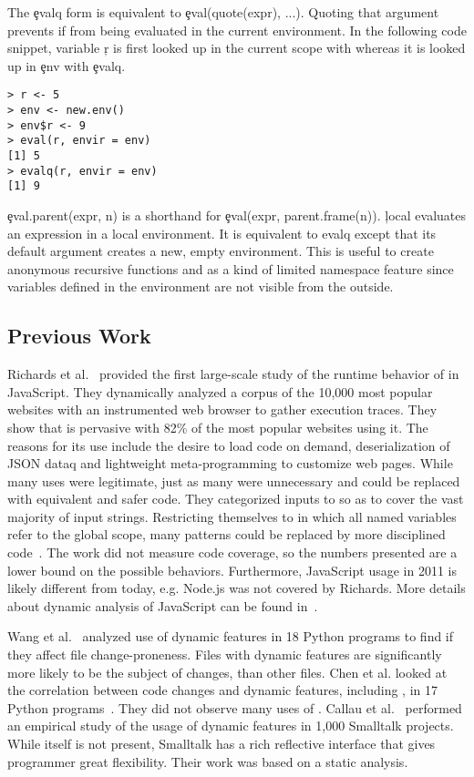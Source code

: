 \documentclass[USenglish,cleveref, autoref, thm-restate]{lipics-v2019}
\begin{document}
The \c{evalq} form is equivalent to \c{eval(quote(expr), ...)}.  Quoting
that argument prevents if from being evaluated in the current environment.
In the following code snippet, variable \c{r} is first looked up in
the current scope with \eval whereas it is looked up in \c{env} with
\c{evalq}.

\begin{lstlisting}
> r <- 5
> env <- new.env()
> env$r <- 9
> eval(r, envir = env)
[1] 5
> evalq(r, envir = env)
[1] 9
\end{lstlisting}

\c{eval.parent(expr, n)} is a shorthand for \c{eval(expr, parent.frame(n))}.
\c{local} evaluates an expression in a local environment. It is equivalent
to evalq except that its default argument creates a new, empty
environment. This is useful to create anonymous recursive functions and as a
kind of limited namespace feature since variables defined in the environment
are not visible from the outside.



\subsection{Previous Work}

Richards et al.~\cite{ecoop11} provided the first large-scale study of
the runtime behavior of \eval in JavaScript. They dynamically analyzed
a corpus of the 10,000 most popular websites with an instrumented web
browser to gather execution traces.  They show that \eval is pervasive
with 82\% of the most popular websites using it. The reasons for its
use include the desire to load code on demand, deserialization of JSON
dataq and lightweight meta-programming to customize web pages.  While
many uses were legitimate, just as many were unnecessary and could be
replaced with equivalent and safer code.  They categorized inputs to
\eval so as to cover the vast majority of input strings.  Restricting
themselves to \eval in which all named variables refer to the global
scope, many patterns could be replaced by more disciplined
code~\cite{oopsla12b}.  The work did not measure code coverage, so the
numbers presented are a lower bound on the possible behaviors.
Furthermore, JavaScript usage in 2011 is likely different from today,
e.g. Node.js was not covered by Richards.  More details about dynamic
analysis of JavaScript can be found in~\cite{liang}.

Wang et al.~\cite{wang} analyzed use of dynamic features in 18 Python
programs to find if they affect file change-proneness.  Files with
dynamic features are significantly more likely to be the subject of
changes, than other files.  Chen et al. looked at the correlation
between code changes and dynamic features, including \eval, in 17
Python programs~\cite{chen}. They did not observe many uses of \eval.
Callau et al.~\cite{oscar} performed an empirical study of the usage
of dynamic features in 1,000 Smalltalk projects. While \eval itself is
not present, Smalltalk has a rich reflective interface that gives
programmer great flexibility. Their work was based on a static
analysis.  %
\end{document}
